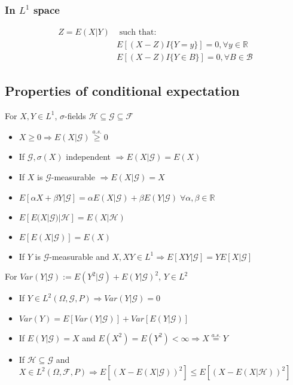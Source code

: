\documentclass{article}
\begin{document}
\subsubsection{In $L^1$ space}
\begin{align*}
  Z = E(X|Y)& \textrm{ such that}:\\
  & E[(X - Z)I\{Y = y\}] = 0, \forall y \in \mathbb{R}\\
  & E[(X - Z)I\{Y \in B\}] = 0, \forall B \in \mathcal{B}
\end{align*}

\subsection{Properties of conditional expectation}
For $X, Y \in L^1$, $\sigma$-fields $\mathcal{H} \subseteq \mathcal{G} \subseteq \mathcal{F}$
\begin{itemize}
  \item $X \geq 0 \Longrightarrow E(X | \mathcal{G}) \overset{a.s.}{\geq} 0$
  \item If $\mathcal{G}, \sigma(X)$ independent $\Longrightarrow E(X|\mathcal{G}) = E(X)$
  \item If $X$ is $\mathcal{G}$-measurable $\Longrightarrow E(X|\mathcal{G}) = X$
  \item $E[\alpha X + \beta Y | \mathcal{G}] = \alpha E(X|\mathcal{G}) + \beta E(Y | \mathcal{G})\; \forall \alpha, \beta \in \mathbb{R}$
  \item $E[E(X|\mathcal{G})|\mathcal{H}] = E(X|\mathcal{H})$
  \item $E[E(X | \mathcal{G})] = E(X)$
  \item If $Y$ is $\mathcal{G}$-measurable and $X, XY \in L^1 \Longrightarrow E[XY | \mathcal{G}] = YE[X | \mathcal{G}]$
\end{itemize}
For $Var(Y|\mathcal{G}) := E(Y^2 | \mathcal{G}) + E(Y | \mathcal{G})^2$, $Y \in L^2$
\begin{itemize}
  \item If $Y \in L^2(\Omega, \mathcal{G}, P) \Longrightarrow Var(Y|\mathcal{G}) = 0$
  \item $Var(Y) = E[Var(Y | \mathcal{G})] + Var[E(Y | \mathcal{G})]$
  \item If $E(Y|\mathcal{G}) = X$ and $E(X^2) = E(Y^2) < \infty \Longrightarrow X \overset{a.s.}{=} Y$
  \item If $\mathcal{H} \subseteq \mathcal{G}$ and $X \in L^2(\Omega, \mathcal{F}, P) \Longrightarrow E[(X - E(X | \mathcal{G}))^2] \leq E[(X - E(X|\mathcal{H}))^2]$
\end{itemize}
\end{document}
